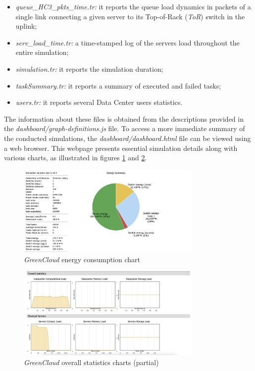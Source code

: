 \begin{itemize}
    \item \emph{queue\_HC3\_pkts\_time.tr:} it reports the queue load dynamics in packets of a single link connecting a given server to its Top-of-Rack (\emph{ToR}) switch in the uplink;
    \item \emph{serv\_load\_time.tr:} a time-stamped log of the servers load throughout the entire simulation;
    \item \emph{simulation.tr:} it reports the simulation duration;
    \item \emph{taskSummary.tr:} it reports a summary of executed and failed tasks;
    \item \emph{users.tr:} it reports several Data Center users statistics.
\end{itemize}
The information about these files is obtained from the descriptions provided in the \emph{dashboard/graph-definitions.js} file. To access a more immediate summary of the conducted simulations, the \emph{dashboard/dashboard.html} file can be viewed using a web browser. This webpage presents essential simulation details along with various charts, as illustrated in figures \ref{fig:greencloud_energy} and \ref{fig:greencloud_overall}. 
\begin{figure}[h]
    \centering
    \includegraphics[width=0.8\textwidth]{chapters/images/greencloud_energy.png}
    \caption{\emph{GreenCloud} energy consumption chart}
    \label{fig:greencloud_energy}
\end{figure}

\begin{figure}[h]
    \centering
    \includegraphics[width=0.8\textwidth]{chapters/images/greencloud_overall.png}
    \caption{\emph{GreenCloud} overall statistics charts (partial)}
    \label{fig:greencloud_overall}
\end{figure}
